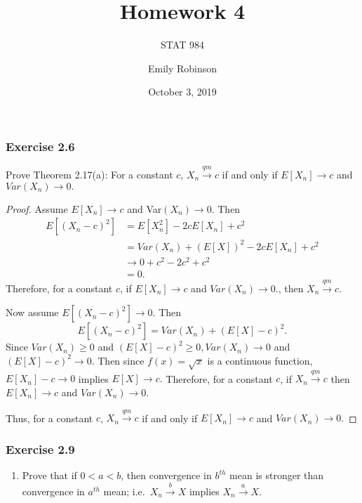 \documentclass[12pt,]{article}
\title{Homework 4}
\subtitle{STAT 984}
\author{Emily Robinson}
\date{October 3, 2019}
\providecommand{\tightlist}{%
  \setlength{\itemsep}{0pt}\setlength{\parskip}{0pt}}
\begin{document}
\maketitle

\hypertarget{exercise-2.6}{%
\subsubsection{Exercise 2.6}\label{exercise-2.6}}

Prove Theorem 2.17(a): For a constant \(c\),
\(X_n \overset{qm}\rightarrow c\) if and only if \(E[X_n]\rightarrow c\)
and \(Var(X_n) \rightarrow 0.\)

\begin{proof}
Assume $E[X_n] \rightarrow c$ and Var$(X_n) \rightarrow 0.$ Then
\begin{align*}
E\left[(X_n-c)^2\right]&=E[X_n^2]-2cE[X_n]+c^2\\
&=Var(X_n)+\left(E[X]\right)^2-2cE[X_n]+c^2\\
&\rightarrow 0+c^2-2c^2+c^2\\
&=0.
\end{align*}
Therefore, for a constant $c$, if $E[X_n]\rightarrow c$ and $Var(X_n) \rightarrow 0.$, then $X_n \overset{qm}\rightarrow c$.

Now assume $E\left[(X_n-c)^2\right]\rightarrow 0.$ Then 
$$E\left[(X_n-c)^2\right]=Var(X_n)+(E[X]-c)^2.$$
Since $Var(X_n) \ge 0$ and $(E[X]-c)^2 \ge 0, Var(X_n) \rightarrow 0$ and $(E[X]-c)^2\rightarrow 0.$ Then since $f(x) = \sqrt{x}$ is a continuous function, $E[X_n]-c\rightarrow 0$ implies $E[X]\rightarrow c.$ Therefore, for a constant $c$, if $X_n \overset{qm}\rightarrow c$ then $E[X_n]\rightarrow c$ and $Var(X_n) \rightarrow 0.$

Thus, for a constant $c$, $X_n \overset{qm}\rightarrow c$ if and only if $E[X_n]\rightarrow c$ and $Var(X_n) \rightarrow 0.$
\end{proof}

\hypertarget{exercise-2.9}{%
\subsubsection{Exercise 2.9}\label{exercise-2.9}}

\begin{enumerate}
\def\labelenumi{(\alph{enumi})}
\tightlist
\item
  Prove that if \(0<a<b\), then convergence in \(b^{th}\) mean is
  stronger than convergence in \(a^{th}\) mean;
  i.e.~\(X_n \overset{b}\rightarrow X\) implies
  \(X_n \overset{a}\rightarrow X\).
\end{enumerate}
\end{document}

